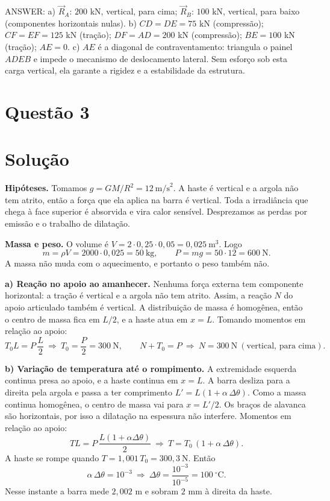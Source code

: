 \documentclass{article}%
\begin{document}
\medskip
ANSWER: a) $\vec R_A$: $200$ kN, vertical, para cima; $\vec R_B$: $100$ kN, vertical, para baixo (componentes horizontais nulas). b) $CD=DE=75$ kN (compressão); $CF=EF=125$ kN (tração); $DF=AD=200$ kN (compressão); $BE=100$ kN (tração); $AE=0$. c) $AE$ é a diagonal de contraventamento: triangula o painel $ADEB$ e impede o mecanismo de deslocamento lateral. Sem esforço sob esta carga vertical, ela garante a rigidez e a estabilidade da estrutura.%
\newpage%
\section*{Questão 3}

\section*{Solução}

\textbf{Hipóteses.} Tomamos $g = GM/R^2 = 12\ \text{m/s}^2$. A haste é vertical e a argola não tem atrito, então a força que ela aplica na barra é vertical. Toda a irradiância que chega à face superior é absorvida e vira calor sensível. Desprezamos as perdas por emissão e o trabalho de dilatação.

\medskip
\textbf{Massa e peso.} O volume é $V = 2\cdot 0{,}25\cdot 0{,}05 = 0{,}025\ \text{m}^3$. Logo
\[
m = \rho V = 2000\cdot 0{,}025 = 50\ \text{kg},\qquad P = mg = 50\cdot 12 = 600\ \text{N}.
\]
A massa não muda com o aquecimento, e portanto o peso também não.

\medskip
\textbf{a) Reação no apoio ao amanhecer.} Nenhuma força externa tem componente horizontal: a tração é vertical e a argola não tem atrito. Assim, a reação $N$ do apoio articulado também é vertical. A distribuição de massa é homogênea, então o centro de massa fica em $L/2$, e a haste atua em $x = L$. Tomando momentos em relação ao apoio:
\[
T_0 L = P\,\frac{L}{2}\ \Rightarrow\ T_0 = \frac{P}{2} = 300\ \text{N},
\qquad
N + T_0 = P\ \Rightarrow\ N = 300\ \text{N}\ (\text{vertical, para cima}).
\]

\medskip
\textbf{b) Variação de temperatura até o rompimento.} A extremidade esquerda continua presa ao apoio, e a haste continua em $x = L$. A barra desliza para a direita pela argola e passa a ter comprimento $L' = L(1+\alpha\,\Delta\theta)$. Como a massa continua homogênea, o centro de massa vai para $x = L'/2$. Os braços de alavanca são horizontais, por isso a dilatação na espessura não interfere. Momentos em relação ao apoio:
\[
T L = P\,\frac{L(1+\alpha\Delta\theta)}{2}\ \Rightarrow\ T = T_0\,(1+\alpha\,\Delta\theta).
\]
A haste se rompe quando $T = 1{,}001\,T_0 = 300{,}3\ \text{N}$. Então
\[
\alpha\,\Delta\theta = 10^{-3}\ \Rightarrow\ \Delta\theta = \frac{10^{-3}}{10^{-5}} = 100\ ^\circ\text{C}.
\]
Nesse instante a barra mede $2{,}002$ m e sobram $2$ mm à direita da haste.
\end{document}
